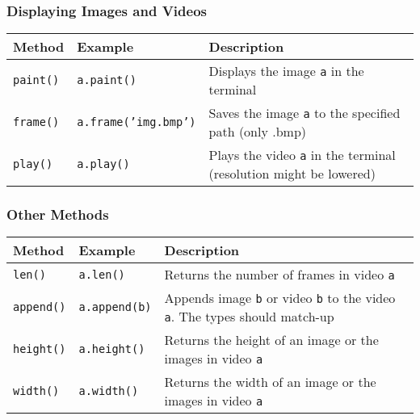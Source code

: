 \documentclass[a4paper, 11pt]{article}
\begin{document}
          \subsubsection{Displaying Images and Videos}
            \begin{tabular}{ |p{4cm}|p{5cm}|p{7cm}|  }
                \hline
                \textbf{Method} & \textbf{Example} & \textbf{Description}\\ 
                \hline
                \texttt{paint()} & \texttt{a.paint()} & Displays the image \texttt{a} in the terminal \\ \hline
                \texttt{frame()} & \texttt{a.frame('img.bmp')} & Saves the image \texttt{a} to the specified path (only .bmp) \\ \hline
                \texttt{play()} & \texttt{a.play()} & Plays the video \texttt{a} in the terminal (resolution might be lowered)\\ \hline
             \end{tabular}


          \subsubsection{Other Methods}

          \begin{tabular}{ |p{4cm}|p{5cm}|p{7cm}|  }
            \hline
            \textbf{Method} & \textbf{Example} & \textbf{Description}\\ 
            \hline
            \texttt{len()} & \texttt{a.len()} & Returns the number of frames in video \texttt{a} \\ \hline
            \texttt{append()} & \texttt{a.append(b)} & Appends image \texttt{b} or video \texttt{b} to the video \texttt{a}. The types should match-up \\ \hline
            \texttt{height()} & \texttt{a.height()} & Returns the height of an image or the images in video \texttt{a} \\ \hline
            \texttt{width()} & \texttt{a.width()} & Returns the width of an image or the images in video \texttt{a} \\ \hline
         \end{tabular}
             
\end{document}
